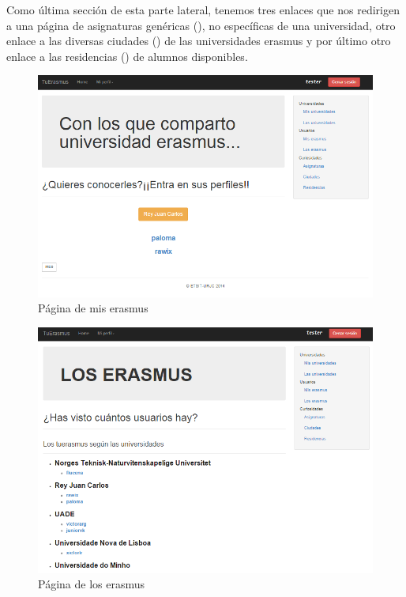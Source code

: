 Como \'ultima secci\'on de esta parte lateral, tenemos tres enlaces que nos redirigen a una p\'agina de asignaturas gen\'ericas (\textit{}), no espec\'ificas de una universidad, otro enlace a las diversas ciudades (\textit{}) de las universidades erasmus y por \'ultimo otro enlace a las residencias (\textit{}) de alumnos disponibles.\\

\begin{figure}[htbp]
	
	\centering
	\includegraphics[scale=0.5]{./Figuras/tuerasmusPages/privatePages/myErasmus.png}
	\caption{P\'agina de mis erasmus}
	\label{fig:myEras}
	
\end{figure}
\begin{figure}[htbp]
	
	\centering
	\includegraphics[scale=0.5]{./Figuras/tuerasmusPages/privatePages/losErasmus.png}
	\caption{P\'agina de los erasmus}
	\label{fig:losEras}
	
\end{figure}
